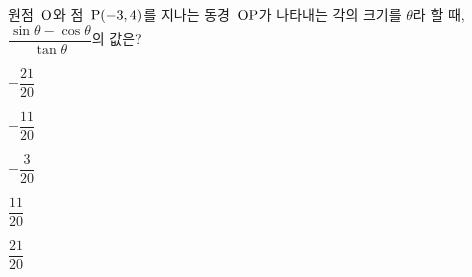 원점~$\mathrm{O}$와 점~$\mathrm{P}(-3{,}\mkern3mu\mathopen{}4)$를 지나는 동경~$\mathrm{OP}$가 나타내는 각의 크기를 $\theta$라 할 때, $\dfrac{\sin\theta-\cos\theta}{\tan\theta}$의 값은?
\begin{choices32}{\rule[-3ex]{0pt}{8ex}$-\dfrac{21}{20}$}{\rule[-3ex]{0pt}{8ex}$-\dfrac{11}{20}$}{\rule[-3ex]{0pt}{8ex}$-\dfrac{3}{20}$}{\rule[-3ex]{0pt}{8ex}$\dfrac{11}{20}$}{\rule[-3ex]{0pt}{8ex}$\dfrac{21}{20}$}\end{choices32}

